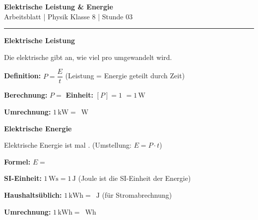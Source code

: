 \documentclass[11pt, a4paper]{article}
\newcommand{\fach}{Physik}
\newcommand{\thema}{Elektrische Leistung \& Energie}
\newcommand{\klasse}{8}
\newcommand{\stunde}{03}
\newcommand{\luecke}[1]{\underline{\hspace{#1}}}
\newcommand{\ein}[1]{\,\mathrm{#1}}
\begin{document}
\begin{center}
    {\Large\bfseries\textcolor{fachfarbe}{\thema}}\\[0.2em]
    {\small Arbeitsblatt | \fach{} Klasse \klasse{} | Stunde \stunde}
\end{center}
\vspace{-0.3em}
\hrule
\vspace{0.6em}


\begin{merkkasten}
\textbf{Elektrische Leistung}

Die elektrische \luecke{2.5cm} gibt an, wie viel \luecke{2.5cm} pro \luecke{2cm} umgewandelt wird.

\vspace{0.3em}
\textbf{Definition:} \quad $P = \dfrac{E}{t}$ \quad (Leistung = Energie geteilt durch Zeit)

\vspace{0.3em}
\textbf{Berechnung:} \quad $P = $ \luecke{2cm} \qquad
\textbf{Einheit:} \quad $[P] = 1$ \luecke{1.5cm} $= 1\ein{W}$

\vspace{0.3em}
\textbf{Umrechnung:} \quad $1\ein{kW} = $ \luecke{1.5cm} $\ein{W}$
\end{merkkasten}


\begin{merkkasten}
\textbf{Elektrische Energie}

Elektrische Energie ist \luecke{2.5cm} mal \luecke{2cm}. \quad (Umstellung: $E = P \cdot t$)

\vspace{0.3em}
\textbf{Formel:} \quad $E = $ \luecke{2cm}

\vspace{0.3em}
\textbf{SI-Einheit:} \quad $1\ein{Ws} = 1\ein{J}$ \quad (Joule ist die SI-Einheit der Energie)

\vspace{0.3em}
\textbf{Haushaltsüblich:} \quad $1\ein{kWh} = $ \luecke{2.5cm} $\ein{J}$ \quad (für Stromabrechnung)

\vspace{0.3em}
\textbf{Umrechnung:} \quad $1\ein{kWh} = $ \luecke{1.5cm} $\ein{Wh}$
\end{merkkasten}
\end{document}
